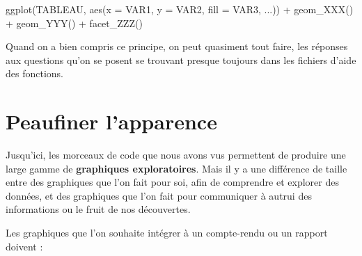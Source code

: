 \documentclass[
  letterpaper,
  DIV=11,
  numbers=noendperiod]{scrreprt}
\newenvironment{Shaded}{\begin{snugshade}}{\end{snugshade}}
\newcommand{\AttributeTok}[1]{\textcolor[rgb]{0.40,0.45,0.13}{#1}}
\newcommand{\FunctionTok}[1]{\textcolor[rgb]{0.28,0.35,0.67}{#1}}
\newcommand{\NormalTok}[1]{\textcolor[rgb]{0.00,0.23,0.31}{#1}}
\newcommand{\SpecialCharTok}[1]{\textcolor[rgb]{0.37,0.37,0.37}{#1}}
\begin{document}
\begin{tcolorbox}[enhanced jigsaw, bottomtitle=1mm, title=\textcolor{quarto-callout-important-color}{\faExclamation}\hspace{0.5em}{Important}, breakable, opacitybacktitle=0.6, coltitle=black, opacityback=0, toprule=.15mm, toptitle=1mm, titlerule=0mm, colback=white, rightrule=.15mm, arc=.35mm, leftrule=.75mm, bottomrule=.15mm, left=2mm, colframe=quarto-callout-important-color-frame, colbacktitle=quarto-callout-important-color!10!white]

\begin{Shaded}
\begin{Highlighting}[]
\FunctionTok{ggplot}\NormalTok{(TABLEAU, }\FunctionTok{aes}\NormalTok{(}\AttributeTok{x =}\NormalTok{ VAR1, }\AttributeTok{y =}\NormalTok{ VAR2, }\AttributeTok{fill =}\NormalTok{ VAR3, ...)) }\SpecialCharTok{+}
  \FunctionTok{geom\_XXX}\NormalTok{() }\SpecialCharTok{+}
  \FunctionTok{geom\_YYY}\NormalTok{() }\SpecialCharTok{+}
  \FunctionTok{facet\_ZZZ}\NormalTok{()}
\end{Highlighting}
\end{Shaded}

\end{tcolorbox}

Quand on a bien compris ce principe, on peut quasiment tout faire, les
réponses aux questions qu'on se posent se trouvant presque toujours dans
les fichiers d'aide des fonctions.

\hypertarget{peaufiner-lapparence}{%
\section{Peaufiner l'apparence}\label{peaufiner-lapparence}}

Jusqu'ici, les morceaux de code que nous avons vus permettent de
produire une large gamme de \textbf{graphiques exploratoires}. Mais il y
a une différence de taille entre des graphiques que l'on fait pour soi,
afin de comprendre et explorer des données, et des graphiques que l'on
fait pour communiquer à autrui des informations ou le fruit de nos
découvertes.

Les graphiques que l'on souhaite intégrer à un compte-rendu ou un
rapport doivent :
\end{document}
